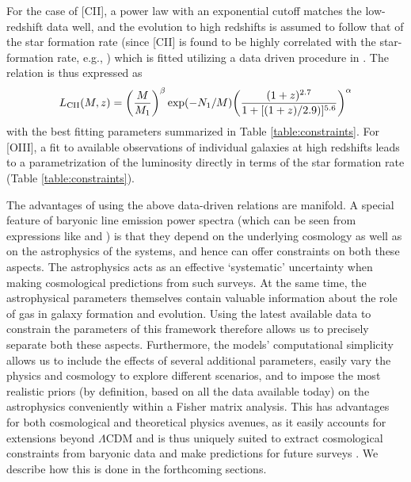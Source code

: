 For the case of [CII], a power law with an exponential cutoff matches the low-redshift data well, and the evolution to high redshifts is assumed to follow that of the star formation rate (since [CII] is found to be highly correlated with the star-formation rate, e.g., \cite{knudsen2016}) which is fitted utilizing a data driven procedure in \cite{behroozi2013, behroozi2019}. The relation is thus expressed as
\begin{equation}
 L_{\rm CII}(M,z) = \displaystyle{\left(\frac{M}{M_1}\right)}^{\beta} \exp(-N_1/M) \displaystyle{\left(\frac{(1+z)^{2.7}}{1 + [(1+z)/2.9)]^{5.6}} \right)^{\alpha}}   
\end{equation}
with the best fitting parameters  summarized in Table \ref{table:constraints}.
For [OIII], a fit to available observations of individual galaxies at high redshifts \cite{harikane2020} leads to a parametrization of the luminosity directly in terms of the star formation rate (Table \ref{table:constraints}).


 The advantages of using the above data-driven relations are manifold. A special feature of baryonic line emission power spectra (which can be seen from expressions like  and ) is that they
depend on the underlying cosmology as well as on the astrophysics of the  systems, and hence can offer constraints on both these aspects. The astrophysics acts as an effective ‘systematic’ uncertainty when making cosmological predictions from such surveys. At the same time, the astrophysical parameters themselves contain valuable information about the role of gas in galaxy formation and evolution. Using the latest available data to constrain the parameters of this framework therefore allows us to  precisely separate both these aspects. Furthermore, the models' computational simplicity allows us to include the effects of several additional parameters, easily vary the physics and cosmology to explore different scenarios, and to impose the most realistic priors (by definition, based on all the data available today) on the astrophysics conveniently within a Fisher matrix analysis. This has advantages for both cosmological and theoretical physics avenues, as it easily accounts for extensions beyond $\Lambda$CDM and is thus uniquely suited to extract cosmological constraints from baryonic data  and make predictions for future surveys \cite{hparaa2019}. We describe how this is done in the forthcoming sections.

